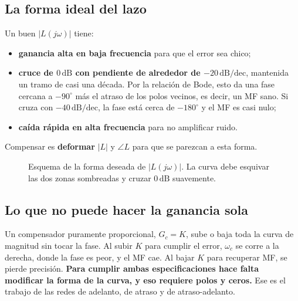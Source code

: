 \documentclass[11pt,a4paper]{article}
\newcommand{\dB}{\,\mathrm{dB}}
\newcommand{\dBdec}{\,\mathrm{dB/dec}}
\newcommand{\jw}{j\omega}
\newcommand{\wc}{\omega_c}
\begin{document}
\subsection{La forma ideal del lazo}
\begin{idea}
Un buen $|L(\jw)|$ tiene:
\begin{itemize}
\item \textbf{ganancia alta en baja frecuencia} para que el error sea chico;
\item \textbf{cruce de $0\dB$ con pendiente de alrededor de $-20\dBdec$}, mantenida un tramo de casi una década. Por la relación de Bode,
      esto da una fase cercana a $-90^\circ$ más el atraso de los polos vecinos, es decir, un MF sano. Si cruza con $-40\dBdec$,
      la fase está cerca de $-180^\circ$ y el MF es casi nulo;
\item \textbf{caída rápida en alta frecuencia} para no amplificar ruido.
\end{itemize}
Compensar es \textbf{deformar} $|L|$ y $\angle L$ para que se parezcan a esta forma.
\end{idea}

\begin{figure}[ht]
\centering
{}
\caption{Esquema de la forma deseada de $|L(\jw)|$. La curva debe esquivar las dos zonas sombreadas y cruzar $0\dB$ suavemente.}
\label{fig:shape}
\end{figure}

\subsection{Lo que no puede hacer la ganancia sola}
Un compensador puramente proporcional, $G_c=K$, sube o baja toda la curva de magnitud sin tocar la fase. Al subir $K$
para cumplir el error, $\wc$ se corre a la derecha, donde la fase es peor, y el MF cae. Al bajar $K$ para recuperar MF,
se pierde precisión. \textbf{Para cumplir ambas especificaciones hace falta modificar la forma de la curva, y eso
requiere polos y ceros.} Ese es el trabajo de las redes de adelanto, de atraso y de atraso-adelanto.
\end{document}
